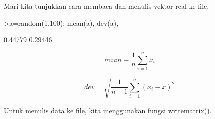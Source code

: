 \documentclass{article}
\begin{document}
\begin{eulernotebook}
\begin{eulercomment}
\begin{eulercomment}
\begin{eulercomment}
\begin{eulercomment}
\begin{eulercomment}
\begin{eulercomment}
\begin{eulercomment}
\begin{eulercomment}
\begin{eulercomment}
\begin{eulercomment}
\begin{eulercomment}
\begin{eulercomment}
\begin{eulercomment}
\begin{eulercomment}
\begin{eulercomment}
Mari kita tunjukkan cara membaca dan menulis vektor real ke file.
\end{eulercomment}
\begin{eulerprompt}
>a=random(1,100); mean(a), dev(a),
\end{eulerprompt}
\begin{euleroutput}
  0.44779
  0.29446
\end{euleroutput}
\begin{eulerformula}
\[
mean= \frac{1}{n} \sum_{i=1}^n x_i
\]
\end{eulerformula}
\begin{eulerformula}
\[
dev= \sqrt{\frac{1}{n-1}\sum_{i=1}^n(x_i-x)^2}
\]
\end{eulerformula}
\begin{eulercomment}
Untuk menulis data ke file, kita menggunakan fungsi writematrix().


\end{eulercomment}
\end{eulercomment}
\end{eulercomment}
\end{eulercomment}
\end{eulercomment}
\end{eulercomment}
\end{eulercomment}
\end{eulercomment}
\end{eulercomment}
\end{eulercomment}
\end{eulercomment}
\end{eulercomment}
\end{eulercomment}
\end{eulercomment}
\end{eulercomment}
\end{eulernotebook}
\end{document}
